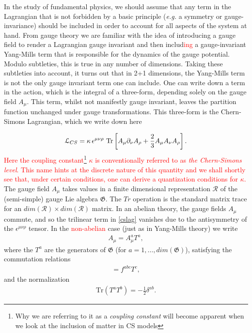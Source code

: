     In the study of fundamental physics, we should assume that any term in the Lagrangian that is not forbidden by a basic principle (\textit{e.g.} a symmetry or gauge-invariance) should be included in order to account for all aspects of the system at hand. From gauge theory we are familiar with the idea of introducing a gauge field to render a Lagrangian gauge invariant and then includ\textcolor{red}{ing} a gauge-invariant Yang-Mills term that is responsible for the dynamics of the gauge potential. Modulo subtleties, this is true in any number of dimensions. Taking these subtleties into account, it turns out that in 2+1 dimensions, the Yang-Mills term is not the only gauge invariant term one can include. One can write down a term in the action, which is the integral of a three-form, depending solely on the gauge field $A_{\mu}$. This term, whilst not manifestly gauge invariant, leaves the partition function unchanged under gauge transformations. This three-form is the Chern-Simons Lagrangian, which we write down here

\begin{equation}
    {\mathcal{L}}_{CS}= \kappa \, \epsilon^{\mu\nu\rho} \  \mathrm{Tr} \left[ A_\mu\partial_\nu A_\rho +{2\over 3} A_\mu A_\nu A_\rho \right].
\label{cslag}
\end{equation}
 \textcolor{red}{Here the coupling constant\footnote{Why we are referring to it as a \textit{coupling constant} will become apparent when we look at the inclusion of matter in CS models} $\kappa$ is conventionally referred to as \textit{the Chern-Simons level}. This name hints at the discrete nature of this quantity and we shall shortly see that, under certain conditions, one can derive a quantization conditions for $\kappa$.} The gauge field $A_\mu$ takes values in a finite dimensional representation $\mathcal{R}$ of the (semi-simple) gauge Lie algebra ${\mathfrak{G}}$. The $Tr$ operation is the standard matrix trace for an $dim(\mathcal{R})\times dim(\mathcal{R})$ matrix.  In an abelian theory, the gauge fields
$A_\mu$ commute, and so the trilinear term in \eqref{cslag} vanishes due to the
antisymmetry of the $\epsilon^{\mu\nu\rho}$ tensor. In the \textcolor{red}{non-abelian} case (just as in Yang-Mills theory) we write
\begin{align}
    A_\mu=A_\mu^a T^a,
\end{align}
 where the $T^a$ are the generators of ${\mathfrak{G}}$ (for $a=1,\dots, dim({\mathfrak{G}})$), satisfying the commutation relations
 \begin{align}
    [T^a,T^b]=f^{abc}T^c,
 \end{align}
and the normalization 
\begin{align}
    \mathrm{Tr}(T^a T^b)=-\frac{1}{2}\delta^{ab}.
\end{align}

